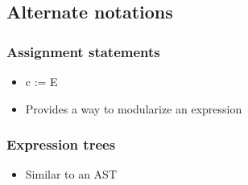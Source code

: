 \documentclass[10pt]{article}
\begin{document}
\subsection{Alternate notations}

\subsubsection{Assignment statements}

\begin{itemize}
	\item c := E
	\item Provides a way to modularize an expression
\end{itemize}

\subsubsection{Expression trees}

\begin{itemize}
	\item Similar to an AST
\end{itemize}
\end{document}

